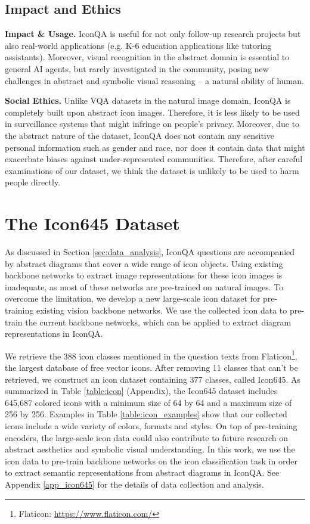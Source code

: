 \documentclass{article}
\begin{document}
\subsection{Impact and Ethics}
\label{sec:impact}

\textbf{Impact \& Usage.} IconQA is useful for not only follow-up research projects but also real-world applications (e.g.  K-6 education applications like tutoring assistants). Moreover, visual recognition in the abstract domain is essential to general AI agents, but rarely investigated in the community, posing new challenges in abstract and symbolic visual reasoning -- a natural ability of human.

\textbf{Social Ethics.} 
Unlike VQA datasets in the natural image domain, IconQA is completely built upon abstract icon images. Therefore, it is less likely to be used in surveillance systems that might infringe on people's privacy. Moreover, due to the abstract nature of the dataset, IconQA does not contain any sensitive personal information such as gender and race, nor does it contain data that might exacerbate biases against under-represented communities. Therefore, after careful examinations of our dataset, we think the dataset is unlikely to be used to harm people directly. 



\section{The Icon645 Dataset}
\label{sec:Icon645}
As discussed in Section \ref{sec:data_analysis}, IconQA questions are accompanied by abstract diagrams that cover a wide range of icon objects. Using existing backbone networks to extract image representations for these icon images is inadequate, as most of these networks are pre-trained on natural images. To overcome the limitation, we develop a new large-scale icon dataset for pre-training existing vision backbone networks. We use the collected icon data to pre-train the current backbone networks, which can be applied to extract diagram representations in IconQA.



We retrieve the 388 icon classes mentioned in the question texts from Flaticon\footnote{Flaticon: \url{https://www.flaticon.com/}}, the largest database of free vector icons. After removing 11 classes that can't be retrieved, we construct an icon dataset containing 377 classes, called Icon645. As summarized in Table \ref{table:icon} (Appendix), the Icon645 dataset includes 645,687 colored icons with a minimum size of 64 by 64 and a maximum size of 256 by 256. Examples in Table \ref{table:icon_examples} show that our collected icons include a wide variety of colors, formats and styles. On top of pre-training encoders, the large-scale icon data could also contribute to future research on abstract aesthetics and symbolic visual understanding. In this work, we use the icon data to pre-train backbone networks on the icon classification task in order to extract semantic representations from abstract diagrams in IconQA. See Appendix \ref{app_icon645} for the details of data collection and analysis.
\end{document}
